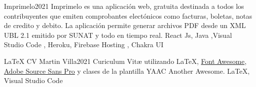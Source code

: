 %


\begin{projects}
	\project
	{Imprimelo}{2021}
	{  }
	{Imprimelo es una aplicación web, gratuita destinada a todos los contribuyentes que emiten comprobantes electónicos como facturas, boletas, notas de credito y debito. La aplicación permite generar archivos PDF desde un XML UBL 2.1 emitido por SUNAT y todo en tiempo real.}
	{React Js, Java ,Visual Studio Code , Heroku, Firebase Hosting , Chakra UI}
	
				
	\project
	{LaTeX CV Martin Villa}{2021}
	{ }
	{Curiculum Vitæ utilizando \LaTeX, \href{https://fontawesome.com}{Font Awesome}, \href{https://fonts.google.com/specimen/Source+Sans+Pro}{Adobe Source Sans Pro} y clases de la plantilla YAAC Another Awesome.}
	{\LaTeX, Visual Studio Code}

\end{projects}